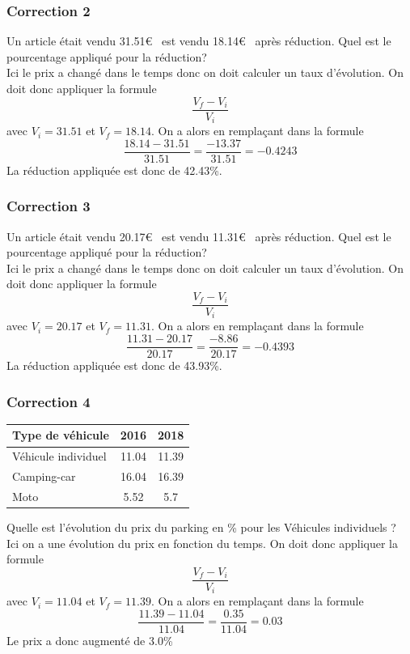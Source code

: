 \documentclass[15pt, mathserif]{beamer}
\begin{document}
\begin{frame}
\vspace{-10mm}
	\frametitle{Correction 2}
Un article était vendu 31.51\euro ~ est vendu 18.14\euro ~ après réduction. Quel est le pourcentage appliqué pour la réduction? \\ Ici le prix a changé dans le temps donc on doit calculer un taux d'évolution. On doit donc appliquer la formule $$\dfrac{V_f-V_i}{V_i}$$ avec $V_i =31.51$ et $V_f=18.14$. On a alors en remplaçant dans la formule $$\dfrac{18.14-31.51}{31.51}= \dfrac{-13.37}{31.51}=-0.4243$$ La réduction appliquée est donc de 42.43\%.\end{frame}


\begin{frame}
\vspace{-10mm}
	\frametitle{Correction 3}
Un article était vendu 20.17\euro ~ est vendu 11.31\euro ~ après réduction. Quel est le pourcentage appliqué pour la réduction? \\ Ici le prix a changé dans le temps donc on doit calculer un taux d'évolution. On doit donc appliquer la formule $$\dfrac{V_f-V_i}{V_i}$$ avec $V_i =20.17$ et $V_f=11.31$. On a alors en remplaçant dans la formule $$\dfrac{11.31-20.17}{20.17}= \dfrac{-8.86}{20.17}=-0.4393$$ La réduction appliquée est donc de 43.93\%.\end{frame}


\begin{frame}
\vspace{-10mm}
	\frametitle{Correction 4}
 
 \begin{center} 
 \begin{tabular}{|C{3cm}|c|c|} 
 \hline 
 {\small Type de véhicule} & {\small 2016} & {\small 2018} \\ 
 \hline 
 {\small Véhicule individuel} & 11.04& 11.39\\ 
 \hline 
 {\small Camping-car } & 16.04& 16.39\\ 
 \hline 
 {\small Moto } & 5.52& 5.7\\ 
 \hline 
 \end{tabular} 
\end{center} 
  {\small Quelle est l'évolution du prix du parking en \% pour les Véhicules individuels ? \\ Ici on a une évolution du prix en fonction du temps. On doit donc appliquer la formule} $$\dfrac{V_f-V_i}{V_i}$$ avec $V_i =11.04$ et $V_f=11.39$. {\small On a alors en remplaçant dans la formule} $$\dfrac{11.39-11.04}{11.04}= \dfrac{0.35}{11.04} = 0.03$$ {\small Le prix a donc augmenté de  3.0\% } \end{frame}
\end{document}
